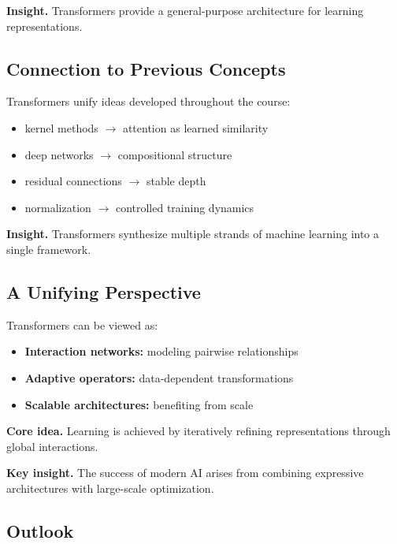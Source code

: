 \medskip

\noindent
\textbf{Insight.}  
Transformers provide a general-purpose architecture for learning representations.

\subsection{Connection to Previous Concepts}

Transformers unify ideas developed throughout the course:

\begin{itemize}
    \item kernel methods $\rightarrow$ attention as learned similarity
    \item deep networks $\rightarrow$ compositional structure
    \item residual connections $\rightarrow$ stable depth
    \item normalization $\rightarrow$ controlled training dynamics
\end{itemize}

\medskip

\noindent
\textbf{Insight.}  
Transformers synthesize multiple strands of machine learning into a single framework.

\subsection{A Unifying Perspective}

Transformers can be viewed as:

\begin{itemize}
    \item \textbf{Interaction networks:} modeling pairwise relationships
    \item \textbf{Adaptive operators:} data-dependent transformations
    \item \textbf{Scalable architectures:} benefiting from scale
\end{itemize}

\medskip

\noindent
\textbf{Core idea.}  
Learning is achieved by iteratively refining representations through global interactions.

\medskip

\noindent
\textbf{Key insight.}  
The success of modern AI arises from combining expressive architectures with large-scale optimization.

\subsection{Outlook}

